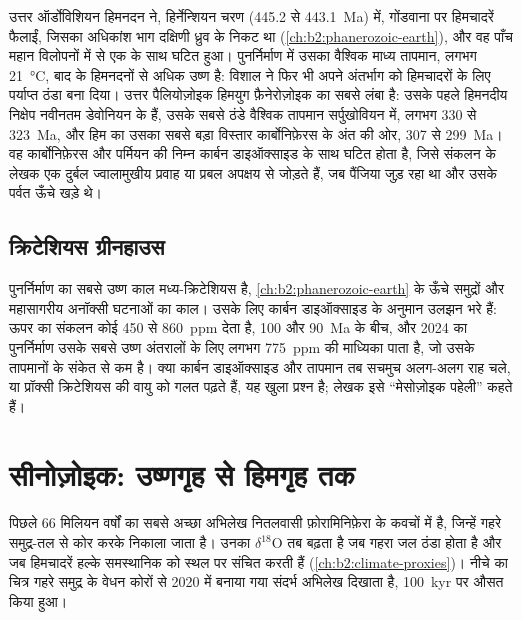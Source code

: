 उत्तर ऑर्डोविशियन हिमनदन ने, हिर्नेन्शियन चरण (445.2 से \qty{443.1}{Ma}) में, गोंडवाना पर हिमचादरें
फैलाईं, जिसका अधिकांश भाग दक्षिणी ध्रुव के निकट था (\cref{ch:b2:phanerozoic-earth}), और वह पाँच
महान विलोपनों में से एक के साथ घटित हुआ। पुनर्निर्माण में उसका वैश्विक माध्य तापमान, लगभग
\qty{21}{\celsius}, बाद के हिमनदनों से अधिक उष्ण है: विशाल  ने फिर भी अपने अंतर्भाग को
हिमचादरों के लिए पर्याप्त ठंडा बना दिया। उत्तर पैलियोज़ोइक हिमयुग फ़ैनेरोज़ोइक का सबसे लंबा है: उसके
पहले हिमनदीय निक्षेप नवीनतम डेवोनियन के हैं, उसके सबसे ठंडे वैश्विक तापमान सर्पुखोवियन में, लगभग
330 से \qty{323}{Ma}, और हिम का उसका सबसे बड़ा विस्तार कार्बोनिफ़ेरस के अंत की ओर, 307 से
\qty{299}{Ma}। वह कार्बोनिफ़ेरस और पर्मियन की निम्न कार्बन डाइऑक्साइड के साथ घटित होता है, जिसे
संकलन के लेखक एक दुर्बल ज्वालामुखीय प्रवाह या प्रबल अपक्षय से जोड़ते हैं, जब पैंजिया जुड़ रहा था
और उसके पर्वत ऊँचे खड़े थे।

\subsection*{क्रिटेशियस ग्रीनहाउस}

पुनर्निर्माण का सबसे उष्ण काल मध्य-क्रिटेशियस है, \cref{ch:b2:phanerozoic-earth} के ऊँचे समुद्रों
और महासागरीय अनॉक्सी घटनाओं का काल। उसके लिए कार्बन डाइऑक्साइड के अनुमान उलझन भरे हैं: ऊपर का
संकलन कोई 450 से \qty{860}{ppm} देता है, 100 और \qty{90}{Ma} के बीच, और 2024 का पुनर्निर्माण
उसके सबसे उष्ण अंतरालों के लिए लगभग \qty{775}{ppm} की माध्यिका पाता है, जो उसके तापमानों के
संकेत से कम है। क्या कार्बन डाइऑक्साइड और तापमान तब सचमुच अलग-अलग राह चले, या प्रॉक्सी
क्रिटेशियस की वायु को गलत पढ़ते हैं, यह खुला प्रश्न है; लेखक इसे ``मेसोज़ोइक
पहेली'' कहते हैं।

\section{सीनोज़ोइक: उष्णगृह से हिमगृह तक}\label{sec:b2:deep-time-climate:cenozoic}

पिछले 66 मिलियन वर्षों का सबसे अच्छा अभिलेख नितलवासी फ़ोरामिनिफ़ेरा के कवचों में है, जिन्हें गहरे
समुद्र-तल से कोर करके निकाला जाता है। उनका $\delta^{18}$O तब बढ़ता है जब गहरा जल ठंडा होता है और जब हिमचादरें
हल्के समस्थानिक को स्थल पर संचित करती हैं (\cref{ch:b2:climate-proxies})। नीचे का चित्र गहरे समुद्र के
वेधन कोरों से 2020 में बनाया गया संदर्भ अभिलेख दिखाता है, \qty{100}{kyr} पर औसत किया हुआ।

